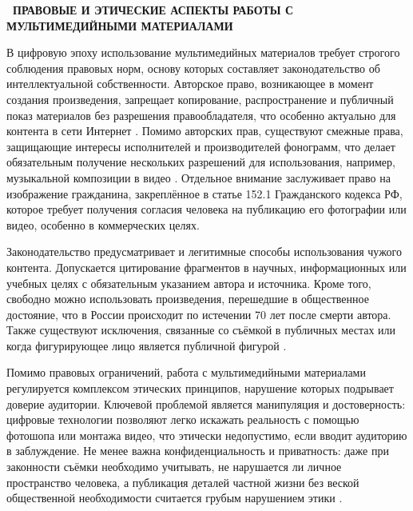 \documentclass{SibFU-docs}
\begin{document}
\newpage
{}
\begin{center}\textbf{\thesection\ ПРАВОВЫЕ И ЭТИЧЕСКИЕ АСПЕКТЫ РАБОТЫ С МУЛЬТИМЕДИЙНЫМИ МАТЕРИАЛАМИ}\end{center}
\vspace*{-1.5em}

В цифровую эпоху использование мультимедийных материалов требует строгого соблюдения правовых норм, основу которых составляет законодательство об интеллектуальной собственности. Авторское право, возникающее в момент создания произведения, запрещает копирование, распространение и публичный показ материалов без разрешения правообладателя, что особенно актуально для контента в сети Интернет \cite{gavrilov2019}. Помимо авторских прав, существуют смежные права, защищающие интересы исполнителей и производителей фонограмм, что делает обязательным получение нескольких разрешений для использования, например, музыкальной композиции в видео \cite{vasilev2020}. Отдельное внимание заслуживает право на изображение гражданина, закреплённое в статье 152.1 Гражданского кодекса РФ, которое требует получения согласия человека на публикацию его фотографии или видео, особенно в коммерческих целях.

Законодательство предусматривает и легитимные способы использования чужого контента. Допускается цитирование фрагментов в научных, информационных или учебных целях с обязательным указанием автора и источника. Кроме того, свободно можно использовать произведения, перешедшие в общественное достояние, что в России происходит по истечении 70 лет после смерти автора. Также существуют исключения, связанные со съёмкой в публичных местах или когда фигурирующее лицо является публичной фигурой \cite{vasilev2020}.


Помимо правовых ограничений, работа с мультимедийными материалами регулируется комплексом этических принципов, нарушение которых подрывает доверие аудитории. Ключевой проблемой является манипуляция и достоверность: цифровые технологии позволяют легко искажать реальность с помощью фотошопа или монтажа видео, что этически недопустимо, если вводит аудиторию в заблуждение. Не менее важна конфиденциальность и приватность: даже при законности съёмки необходимо учитывать, не нарушается ли личное пространство человека, а публикация деталей частной жизни без веской общественной необходимости считается грубым нарушением этики \cite{sizemtsev2021}.
\end{document}
